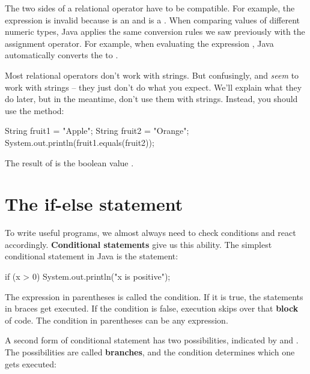 The two sides of a relational operator have to be compatible.
For example, the expression  is invalid because  is an  and  is a .
When comparing values of different numeric types, Java applies the same conversion rules we saw previously with the assignment operator.
For example, when evaluating the expression , Java automatically converts the  to .

Most relational operators don't work with strings.
But confusingly, \java{==} and \java{!=} \emph{seem} to work with strings -- they just don't do what you expect.
We'll explain what they do later, but in the meantime, don't use them with strings.
Instead, you should use the  method:

\begin{code}
String fruit1 = "Apple";
String fruit2 = "Orange";
System.out.println(fruit1.equals(fruit2));
\end{code}

The result of  is the boolean value .


\section{The if-else statement}


To write useful programs, we almost always need to check conditions and react accordingly.
{\bf Conditional statements} give us this ability.
The simplest conditional statement in Java is the  statement:

\begin{code}
if (x > 0) {
    System.out.println("x is positive");
}
\end{code}


The expression in parentheses is called the condition.
If it is true, the statements in braces get executed.
If the condition is false, execution skips over that {\bf block} of code.
The condition in parentheses can be any  expression.


A second form of conditional statement has two possibilities, indicated by  and .
The possibilities are called {\bf branches}, and the condition determines which one gets executed:

